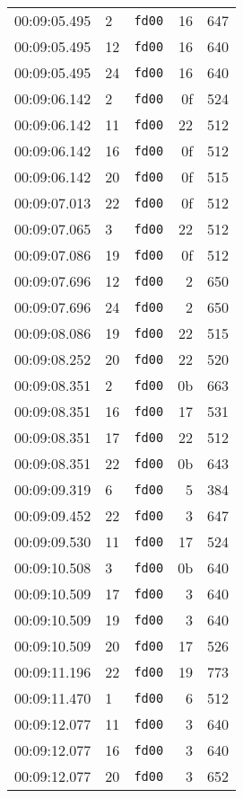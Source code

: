 \documentclass{article}
\begin{document}
\begin{longtable}{lllrr}
00:09:05.495 & 2 & \texttt{fd00} & 16 & 647 \\
00:09:05.495 & 12 & \texttt{fd00} & 16 & 640 \\
00:09:05.495 & 24 & \texttt{fd00} & 16 & 640 \\
00:09:06.142 & 2 & \texttt{fd00} & 0f & 524 \\
00:09:06.142 & 11 & \texttt{fd00} & 22 & 512 \\
00:09:06.142 & 16 & \texttt{fd00} & 0f & 512 \\
00:09:06.142 & 20 & \texttt{fd00} & 0f & 515 \\
00:09:07.013 & 22 & \texttt{fd00} & 0f & 512 \\
00:09:07.065 & 3 & \texttt{fd00} & 22 & 512 \\
00:09:07.086 & 19 & \texttt{fd00} & 0f & 512 \\
00:09:07.696 & 12 & \texttt{fd00} & 2 & 650 \\
00:09:07.696 & 24 & \texttt{fd00} & 2 & 650 \\
00:09:08.086 & 19 & \texttt{fd00} & 22 & 515 \\
00:09:08.252 & 20 & \texttt{fd00} & 22 & 520 \\
00:09:08.351 & 2 & \texttt{fd00} & 0b & 663 \\
00:09:08.351 & 16 & \texttt{fd00} & 17 & 531 \\
00:09:08.351 & 17 & \texttt{fd00} & 22 & 512 \\
00:09:08.351 & 22 & \texttt{fd00} & 0b & 643 \\
00:09:09.319 & 6 & \texttt{fd00} & 5 & 384 \\
00:09:09.452 & 22 & \texttt{fd00} & 3 & 647 \\
00:09:09.530 & 11 & \texttt{fd00} & 17 & 524 \\
00:09:10.508 & 3 & \texttt{fd00} & 0b & 640 \\
00:09:10.509 & 17 & \texttt{fd00} & 3 & 640 \\
00:09:10.509 & 19 & \texttt{fd00} & 3 & 640 \\
00:09:10.509 & 20 & \texttt{fd00} & 17 & 526 \\
00:09:11.196 & 22 & \texttt{fd00} & 19 & 773 \\
00:09:11.470 & 1 & \texttt{fd00} & 6 & 512 \\
00:09:12.077 & 11 & \texttt{fd00} & 3 & 640 \\
00:09:12.077 & 16 & \texttt{fd00} & 3 & 640 \\
00:09:12.077 & 20 & \texttt{fd00} & 3 & 652 \\

\end{longtable}
\end{document}
